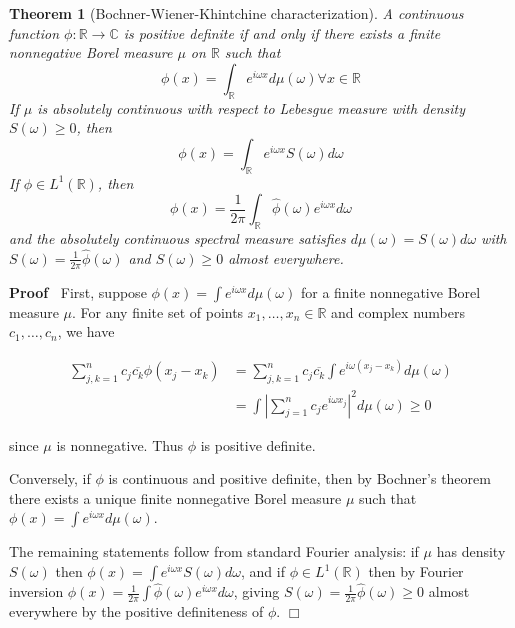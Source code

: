 \documentclass{article}
\newenvironment{proof}{\noindent\textbf{Proof\ }}{\hspace*{\fill}$\Box$\medskip}
{\theorembodyfont{\rmfamily}\newtheorem{example}{Example}}
\newtheorem{theorem}{Theorem}
\begin{document}
\begin{theorem}[Bochner-Wiener-Khintchine characterization]
  A continuous function $\phi : \mathbb{R} \to \mathbb{C}$ is positive
  definite if and only if there exists a finite nonnegative Borel measure
  $\mu$ on $\mathbb{R}$ such that
  \begin{equation}
    \phi (x) = \int_{\mathbb{R}} e^{i \omega x} d \mu (\omega) \forall x \in
    \mathbb{R}
  \end{equation}
  If $\mu$ is absolutely continuous with respect to Lebesgue measure with
  density $S (\omega) \ge 0$, then
  \begin{equation}
    \phi (x) = \int_{\mathbb{R}} e^{i \omega x} S (\omega) d \omega
  \end{equation}
  If $\phi \in L^1 (\mathbb{R})$, then
  \begin{equation}
    \phi (x) = \frac{1}{2 \pi}  \int_{\mathbb{R}} \hat{\phi} (\omega) e^{i
    \omega x} d \omega
  \end{equation}
  and the absolutely continuous spectral measure satisfies $d \mu (\omega) = S
  (\omega) d \omega$ with $S (\omega) = \frac{1}{2 \pi}  \hat{\phi} (\omega)$
  and $S (\omega) \ge 0$ almost everywhere.
\end{theorem}

\begin{proof}
  First, suppose $\phi (x) = \int e^{i \omega x} d \mu (\omega)$ for a finite
  nonnegative Borel measure $\mu$. For any finite set of points $x_1, \ldots,
  x_n \in \mathbb{R}$ and complex numbers $c_1, \ldots, c_n$, we have
  
  \begin{align}
    \sum_{j, k = 1}^n c_j \overline{c_k} \phi (x_j - x_k) & = \sum_{j, k =
    1}^n c_j \overline{c_k} \int e^{i \omega (x_j - x_k)} d \mu (\omega) \\
    & = \int \left| \sum_{j = 1}^n c_j e^{i \omega x_j} \right|^2 d \mu
    (\omega) \geq 0 
  \end{align}
  
  since $\mu$ is nonnegative. Thus $\phi$ is positive definite.
  
  Conversely, if $\phi$ is continuous and positive definite, then by Bochner's
  theorem there exists a unique finite nonnegative Borel measure $\mu$ such
  that $\phi (x) = \int e^{i \omega x} d \mu (\omega)$.
  
  The remaining statements follow from standard Fourier analysis: if $\mu$ has
  density $S (\omega)$ then $\phi (x) = \int e^{i \omega x} S (\omega) d
  \omega$, and if $\phi \in L^1 (\mathbb{R})$ then by Fourier inversion $\phi
  (x) = \frac{1}{2 \pi}  \int \hat{\phi} (\omega) e^{i \omega x} d \omega$,
  giving $S (\omega) = \frac{1}{2 \pi}  \hat{\phi} (\omega) \geq 0$ almost
  everywhere by the positive definiteness of $\phi$.
\end{proof}
\end{document}
